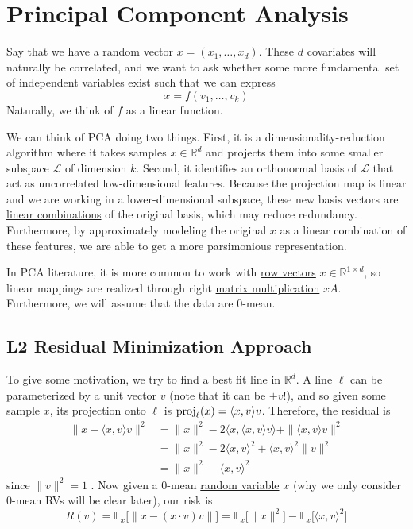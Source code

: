 \section{Principal Component Analysis}  

  Say that we have a random vector $x = (x_1, \ldots, x_d)$. These $d$ covariates will naturally be correlated, and we want to ask whether some more fundamental set of independent variables exist \cite{1933hotelling} such that we can express
  \begin{equation}
    x = f(v_1, \ldots, v_k)
  \end{equation} 
  Naturally, we think of $f$ as a linear function. 

  We can think of PCA doing two things. First, it is a dimensionality-reduction algorithm where it takes samples $x \in \mathbb{R}^d$ and projects them into some smaller subspace $\mathcal{L}$ of dimension $k$. Second, it identifies an orthonormal basis of $\mathcal{L}$ that act as uncorrelated low-dimensional features. Because the projection map is linear and we are working in a lower-dimensional subspace, these new basis vectors are \hyperref[lin-def:linear-combination]{linear combinations} of the original basis, which may reduce redundancy. Furthermore, by approximately modeling the original $x$ as a linear combination of these features, we are able to get a more parsimonious representation. 

  In PCA literature, it is more common to work with \hyperref[lin-def:row-vector]{row vectors} $x \in \mathbb{R}^{1 \times d}$, so linear mappings are realized through right \hyperref[lin-def:matrix-multiplication]{matrix multiplication} $x A$. Furthermore, we will assume that the data are $0$-mean. 

\subsection{L2 Residual Minimization Approach} 

  To give some motivation, we try to find a best fit line in $\mathbb{R}^d$. A line $\ell$ can be parameterized by a unit vector $v$ (note that it can be $\pm v$!), and so given some sample $x$, its projection onto $\ell$ is $\operatorname{proj}_{\ell} (x) = \langle x, v\rangle v$. Therefore, the residual is 
  \begin{align}
    \| x - \langle x, v \rangle v \|^2 & = \|x\|^2 - 2 \langle x, \langle x, v \rangle v \rangle + \| \langle x, v \rangle v \|^2 \\ 
                                       & = \|x\|^2 - 2 \langle x, v \rangle^2 + \langle x, v \rangle^2 \|v\|^2 \\ 
                                       & = \|x\|^2 - \langle x, v \rangle^2
  \end{align}
  since $\|v\|^2 = 1$ \cite{2019shalizi}. Now given a $0$-mean \hyperref[prob-def:random-variable]{random variable} $x$ (why we only consider $0$-mean RVs will be clear later), our risk is
  \begin{equation}
    R(v) = \mathbb{E}_x \big[ \| x - (x \cdot v) v \| \big] = \mathbb{E}_x \big[ \|x\|^2 \big] - \mathbb{E}_x \big[ \langle x, v \rangle^2 \big]
  \end{equation} 

